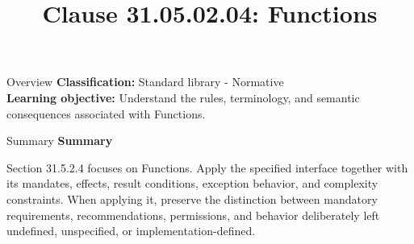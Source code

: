 \documentclass[10pt,letterpaper]{article}
\title{Clause 31.05.02.04: Functions}
\author{}
\date{}
\begin{document}
\maketitle
\begin{CornellOverviewBox}{Overview}
\textbf{Classification:} Standard library - Normative\\[2pt]
\textbf{Learning objective:} Understand the rules, terminology, and semantic consequences associated with Functions.
\end{CornellOverviewBox}\begin{CornellSummaryBox}{Summary}
{\sffamily\bfseries\color{Accent} Summary}\par\vspace{3pt}Section 31.5.2.4 focuses on Functions. Apply the specified interface together with its mandates, effects, result conditions, exception behavior, and complexity constraints. When applying it, preserve the distinction between mandatory requirements, recommendations, permissions, and behavior deliberately left undefined, unspecified, or implementation-defined.
\end{CornellSummaryBox}
\end{document}

